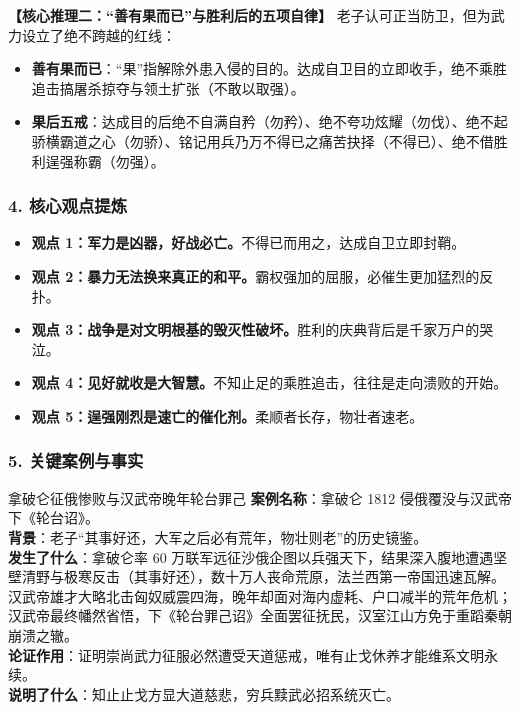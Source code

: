\noindent\textbf{【核心推理二：“善有果而已”与胜利后的五项自律】}
老子认可正当防卫，但为武力设立了绝不跨越的红线：
\begin{itemize}
    \item \textbf{善有果而已}：“果”指解除外患入侵的目的。达成自卫目的立即收手，绝不乘胜追击搞屠杀掠夺与领土扩张（不敢以取强）。
    \item \textbf{果后五戒}：达成目的后绝不自满自矜（勿矜）、绝不夸功炫耀（勿伐）、绝不起骄横霸道之心（勿骄）、铭记用兵乃万不得已之痛苦抉择（不得已）、绝不借胜利逞强称霸（勿强）。
\end{itemize}

\subsubsection{4. 核心观点提炼}
\begin{itemize}
    \item \textbf{观点 1：军力是凶器，好战必亡。}不得已而用之，达成自卫立即封鞘。
    \item \textbf{观点 2：暴力无法换来真正的和平。}霸权强加的屈服，必催生更加猛烈的反扑。
    \item \textbf{观点 3：战争是对文明根基的毁灭性破坏。}胜利的庆典背后是千家万户的哭泣。
    \item \textbf{观点 4：见好就收是大智慧。}不知止足的乘胜追击，往往是走向溃败的开始。
    \item \textbf{观点 5：逞强刚烈是速亡的催化剂。}柔顺者长存，物壮者速老。
\end{itemize}

\subsubsection{5. 关键案例与事实}
\begin{CaseBox}{拿破仑征俄惨败与汉武帝晚年轮台罪己}
\textbf{案例名称}：拿破仑 1812 侵俄覆没与汉武帝下《轮台诏》。\\
\textbf{背景}：老子“其事好还，大军之后必有荒年，物壮则老”的历史镜鉴。\\
\textbf{发生了什么}：拿破仑率 60 万联军远征沙俄企图以兵强天下，结果深入腹地遭遇坚壁清野与极寒反击（其事好还），数十万人丧命荒原，法兰西第一帝国迅速瓦解。汉武帝雄才大略北击匈奴威震四海，晚年却面对海内虚耗、户口减半的荒年危机；汉武帝最终幡然省悟，下《轮台罪己诏》全面罢征抚民，汉室江山方免于重蹈秦朝崩溃之辙。\\
\textbf{论证作用}：证明崇尚武力征服必然遭受天道惩戒，唯有止戈休养才能维系文明永续。\\
\textbf{说明了什么}：知止止戈方显大道慈悲，穷兵黩武必招系统灭亡。
\end{CaseBox}

